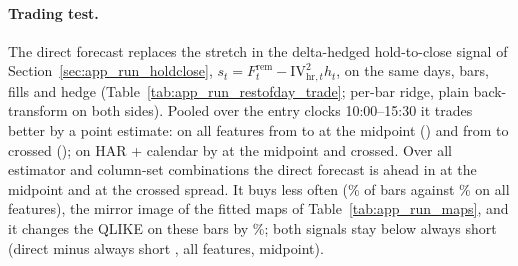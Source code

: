 {{\paragraph{Trading test.} The direct forecast replaces the stretch in the
delta-hedged hold-to-close signal of Section~\ref{sec:app_run_holdclose},
$s_t=F^{\mathrm{rem}}_t-\mathrm{IV}^2_{\mathrm{hr},t}h_t$, on the same days,
bars, fills and hedge (Table~\ref{tab:app_run_restofday_trade}; per-bar ridge,
plain back-transform on both sides). Pooled over the entry clocks 10:00--15:30
it trades better by a point estimate: on all features from \runappTtAfCur{} to
\runappTtAfDir{} at the midpoint (\runappTtAfD{}) and from
\runappTtAfCurX{} to \runappTtAfDirX{} crossed (\runappTtAfDX{}); on HAR +
calendar by \runappTtBaD{} at the midpoint and \runappTtBaDX{} crossed. Over all
\runappTtCombos{} estimator and column-set combinations the direct forecast is
ahead in \runappTtAhead{} at the midpoint and \runappTtAheadX{} at the crossed
spread. It buys less often (\runappTtAfBuyDir{}\% of bars against
\runappTtAfBuyCur{}\% on all features), the mirror image of the fitted maps of
Table~\ref{tab:app_run_maps}, and it changes the QLIKE on these bars by
\runappTtAfQ{}\%; both signals stay below always short (direct minus always
short \runappTtAfVsShort{}, all features, midpoint).
}{}%
\begin{table}[H]
\centering
\caption{Trading test of the direct rest-of-day forecast in the delta-hedged
hold-to-close book, per-bar ridge, on the \runappHcNdays{} days (the
generator's table, read as generated). Top: pooled over the entry clocks
10:00--15:30 (daily sums), Sharpe ratios of the current signal
($\widehat{RV}_t/w_t$) and the direct one ($F^{\mathrm{rem}}_t$) and their
paired difference, plain back-transform on both sides. Bottom: by entry clock,
midpoint.}
\label{tab:app_run_restofday_trade}
\end{table}}{}

